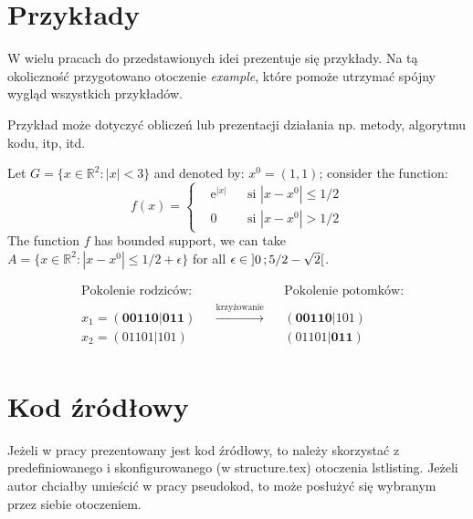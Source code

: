 

\section{Przykłady}

W wielu pracach do przedstawionych idei prezentuje się przykłady. Na tą okoliczność przygotowano otoczenie {\it example}, które pomoże utrzymać spójny wygląd wszystkich przykładów.

Przykład może dotyczyć obliczeń lub prezentacji działania np. metody, algorytmu kodu, itp, itd.

\begin{example}

    Let $G=\{x\in\mathbb{R}^2:|x|<3\}$ and denoted by: $x^0=(1,1)$; consider the function:
    \begin{equation}
        f(x)=\left\{\begin{aligned}
                        & \mathrm{e}^{|x|} & & \text{si $|x-x^0|\leq 1/2$}\\
                        & 0 & & \text{si $|x-x^0|> 1/2$}
        \end{aligned}\right.
    \end{equation}
    The function $f$ has bounded support, we can take $A=\{x\in\mathbb{R}^2:|x-x^0|\leq 1/2+\epsilon\}$ for all $\epsilon\in\mathopen{]}0\,;5/2-\sqrt{2}\mathclose{[}$.
\end{example}


\begin{example}
    \begin{align*}
        &\text{Pokolenie rodziców:} & & & &\text{Pokolenie potomków:} \\
        &x_1 = (\textbf{00110} | \textbf{011}) & &\xrightarrow{\text{krzyżowanie}} & &(\textbf{00110}|1 0 1)\\
        &x_2 = (0 1 1 0 1 | 1 0 1) & & & &(0 1 1 0 1|\textbf{011})\\
    \end{align*}
\end{example}




\section{Kod źródłowy}

Jeżeli w pracy prezentowany jest kod źródłowy, to należy skorzystać z predefiniowanego i skonfigurowanego (w structure.tex) otoczenia lstlisting. Jeżeli autor chciałby umieścić w pracy pseudokod, to może posłużyć się wybranym przez siebie otoczeniem.

